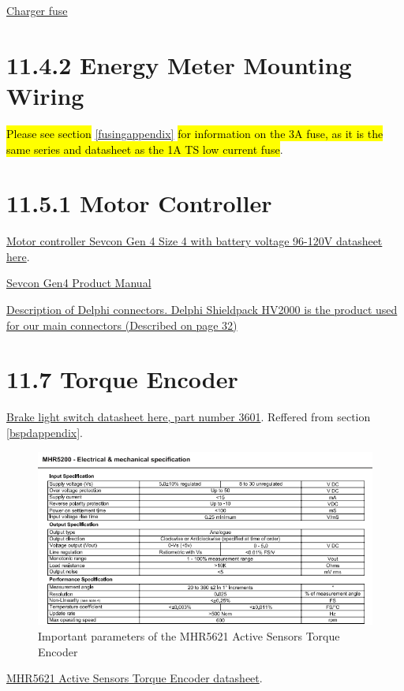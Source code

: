 \documentclass{article}
\DeclareRobustCommand{\hlr}[1]{{\sethlcolor{red}\hl{#1}}}
\begin{document}
\href{http://www.mouser.com/ds/2/87/Bus_Ele_DS_1024_SC-347391.pdf}{Charger fuse}

\section*{11.4.2 Energy Meter Mounting Wiring}

\hlr{Please see section} \ref{fusingappendix} \hlr{for information on the 3A fuse, as it is the same series and datasheet as the 1A TS low current fuse}.

\section*{11.5.1 Motor Controller} \label{mccappendix}

\href{http://www.sevcon.com/media/2461/Gen4\%20Aug\%202013\%20web.pdf}{Motor controller Sevcon Gen 4 Size 4 with battery voltage 96-120V datasheet here}.

\href{http://www.thunderstruck-ev.com/Manuals/Gen4_Product_Manual_V3.0.pdf}{Sevcon Gen4 Product Manual}

\href{http://www.delphi.com/docs/default-source/old-delphi-files/4ab0ce96-6ae1-4ad1-aabb-cdcfa9103cbd-pdf.pdf?sfvrsn=0}{Description of Delphi connectors. Delphi Shieldpack HV2000 is the product used for our main connectors (Described on page 32)}

\section*{11.7 Torque Encoder} \label{torqueappendix}

\href{https://www.pegasusautoracing.com/2015/086.pdf}{Brake light switch datasheet here, part number 3601}. Reffered from section \ref{bspdappendix}.

\begin{figure}[H]
    \centering
    \includegraphics[width = 0.4 \textwidth]{activesensorsnip}
    \caption{Important parameters of the MHR5621 Active Sensors Torque Encoder}
    \label{torquesnip}
\end{figure}

\href{http://www.magni-tec.com/datasheet/WS-MHR5200.pdf}{MHR5621 Active Sensors Torque Encoder datasheet}.
\end{document}
